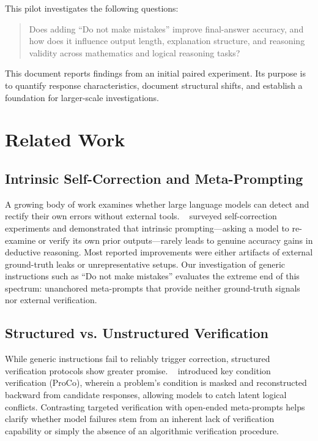 \documentclass[11pt,a4paper]{article}
\begin{document}
This pilot investigates the following questions:
\begin{quote}
Does adding ``Do not make mistakes'' improve final-answer accuracy, and how
does it influence output length, explanation structure, and reasoning validity
across mathematics and logical reasoning tasks?
\end{quote}

This document reports findings from an initial paired experiment. Its purpose
is to quantify response characteristics, document structural shifts, and
establish a foundation for larger-scale investigations.

\section{Related Work}

\subsection{Intrinsic Self-Correction and Meta-Prompting}
A growing body of work examines whether large language models can detect and
rectify their own errors without external tools. \citeauthor{kamoi2024}~\cite{kamoi2024}
surveyed self-correction experiments and demonstrated that intrinsic prompting—asking
a model to re-examine or verify its own prior outputs—rarely leads to genuine
accuracy gains in deductive reasoning. Most reported improvements were either
artifacts of external ground-truth leaks or unrepresentative setups. Our
investigation of generic instructions such as ``Do not make mistakes'' evaluates
the extreme end of this spectrum: unanchored meta-prompts that provide neither
ground-truth signals nor external verification.

\subsection{Structured vs. Unstructured Verification}
While generic instructions fail to reliably trigger correction, structured
verification protocols show greater promise. \citeauthor{wu2024}~\cite{wu2024}
introduced key condition verification (ProCo), wherein a problem's condition is
masked and reconstructed backward from candidate responses, allowing models to catch
latent logical conflicts. Contrasting targeted verification with open-ended
meta-prompts helps clarify whether model failures stem from an inherent lack of
verification capability or simply the absence of an algorithmic verification procedure.
\end{document}
